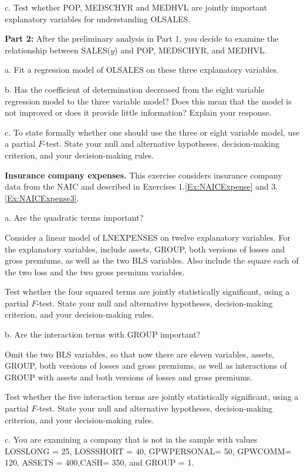 \begin{exercises}
c. Test whether POP, MEDSCHYR and MEDHVL are jointly important
explanatory variables for understanding OLSALES.


\textbf{Part 2:} After the preliminary analysis in Part 1, you
decide to examine the relationship between SALES($y$) and POP,
MEDSCHYR, and MEDHVL.

a. Fit a regression model of OLSALES on these three explanatory
variables.

b. Has the coefficient of determination decreased from the eight
variable regression model to the three variable model? Does this
mean that the model is not improved or does it provide little
information? Explain your response.

c. To state formally whether one should use the three or eight
variable model, use a partial $F$-test. State your null and
alternative hypotheses, decision-making criterion, and your
decision-making rules.


\item \textbf{Insurance company expenses.}\label{Ex:NAICExpense4}
This exercise considers insurance company data from the NAIC and
described in Exercises 1.\ref{Ex:NAICExpense} and
3.\ref{Ex:NAICExpense3}.


a. Are the quadratic terms important?

Consider a linear model of LNEXPENSES on twelve explanatory
variables. For the explanatory variables, include assets, GROUP,
both versions of losses and gross premiums, as well as the two BLS
variables. Also include the square each of the two loss and the two
gross premium variables.

Test whether the four squared terms are jointly statistically
significant, using a partial $F$-test. State your null and
alternative hypotheses, decision-making criterion, and your
decision-making rules.

b. Are the interaction terms with GROUP important?

Omit the two BLS variables, so that now there are eleven variables,
assets, GROUP, both versions of losses and gross premiums, as well
as interactions of GROUP with assets and both versions of losses and
gross premiums.

Test whether the five interaction terms are jointly statistically
significant, using a partial $F$-test. State your null and
alternative hypotheses, decision-making criterion, and your
decision-making rules.

c. You are examining a company that is not in the sample with values
LOSSLONG = 25, LOSSSHORT = 40, GPWPERSONAL= 50, GPWCOMM= 120, ASSETS
= 400,CASH= 350, and GROUP = 1.


\end{exercises}
